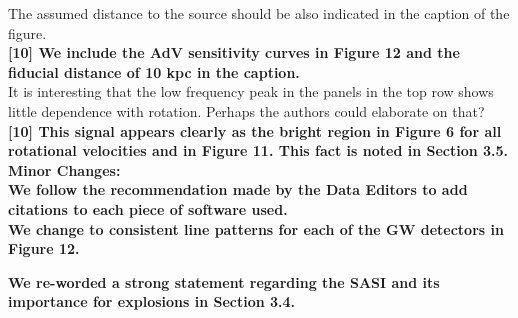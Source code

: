 \documentclass[11pt]{article}
\begin{document}
The assumed distance to the source should be also indicated in the caption of the 
figure.\\

\textbf{[10] We include the AdV sensitivity curves in Figure 12 and the fiducial distance of 10 kpc in the caption.}\\

It is interesting that the low frequency peak in the panels in the top row shows 
little dependence with rotation. Perhaps the authors could elaborate on that?\\

\textbf{[10] This signal appears clearly as the bright region in Figure 6 for all rotational velocities and in Figure 11.  This fact is noted in Section 3.5.}\\

\textbf{Minor Changes:}\\

\textbf{We follow the recommendation made by the Data Editors to add citations to each piece of software used.}\\

\textbf{We change to consistent line patterns for each of the GW detectors in Figure 12.}

\textbf{We re-worded a strong statement regarding the SASI and its importance for explosions in Section 3.4.}

% 
%
% 
%
% 

\newpage

\setcounter{page}{1}  \renewcommand{\thepage}
           {Bibliography -- \arabic{page}}

\renewcommand\bibsection{\section*{References}}
\setlength{\bibsep}{2pt}

\end{document}
